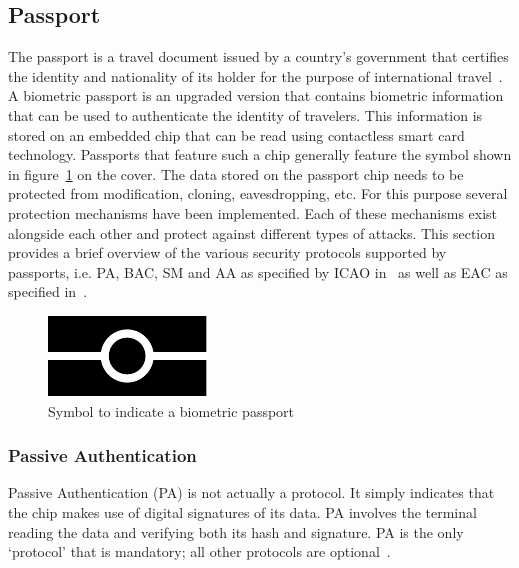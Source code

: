 \subsection{Passport}
\label{subsec:passports}
The passport is a travel document issued by a country's government that certifies the identity and nationality of its holder for the purpose of international travel~\cite{passportdefinition}. A biometric passport is an upgraded version that contains biometric information that can be used to authenticate the identity of travelers. This information is stored on an embedded chip that can be read using contactless smart card technology. Passports that feature such a chip generally feature the symbol shown in figure~\ref{fig:biometricslogo} on the cover. The data stored on the passport chip needs to be protected from modification, cloning, eavesdropping, etc. For this purpose several protection mechanisms have been implemented. Each of these mechanisms exist alongside each other and protect against different types of attacks. This section provides a brief overview of the various security protocols supported by passports, i.e. PA, BAC, SM and AA as specified by ICAO in~\cite{icao} as well as EAC as specified in~\cite{bsi}. 

\begin{figure}[htb]
	\centering
		\includegraphics[scale=0.5]{images/biometrics_logo.pdf}
	\caption{Symbol to indicate a biometric passport}
	\label{fig:biometricslogo}
\end{figure}

\subsubsection{Passive Authentication}
Passive Authentication (PA) is not actually a protocol. It simply indicates that the chip makes use of digital signatures of its data. PA involves the terminal reading the data and verifying both its hash and signature. PA is the only `protocol' that is mandatory; all other protocols are optional~\cite{mostowski2010electronic}.

